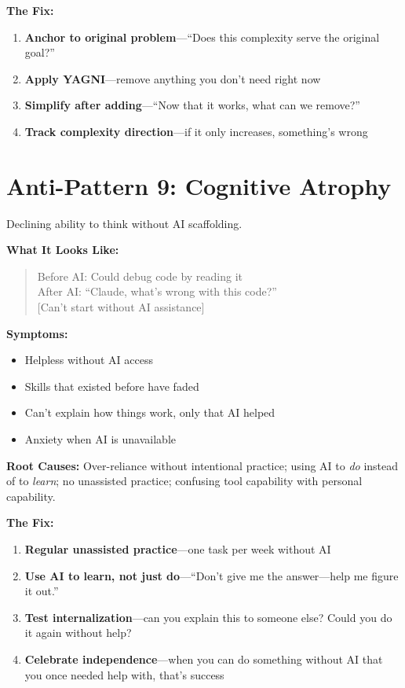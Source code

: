 \textbf{The Fix:}
\begin{enumerate}
    \item \textbf{Anchor to original problem}---``Does this complexity serve the original goal?''
    \item \textbf{Apply YAGNI}---remove anything you don't need right now
    \item \textbf{Simplify after adding}---``Now that it works, what can we remove?''
    \item \textbf{Track complexity direction}---if it only increases, something's wrong
\end{enumerate}

\section{Anti-Pattern 9: Cognitive Atrophy}

Declining ability to think without AI scaffolding.

\textbf{What It Looks Like:}

\begin{quote}
Before AI: Could debug code by reading it\\
After AI: ``Claude, what's wrong with this code?''\\
{[Can't start without AI assistance]}
\end{quote}

\textbf{Symptoms:}
\begin{itemize}
    \item Helpless without AI access
    \item Skills that existed before have faded
    \item Can't explain how things work, only that AI helped
    \item Anxiety when AI is unavailable
\end{itemize}

\textbf{Root Causes:} Over-reliance without intentional practice; using AI to \emph{do} instead of to \emph{learn}; no unassisted practice; confusing tool capability with personal capability.

\textbf{The Fix:}
\begin{enumerate}
    \item \textbf{Regular unassisted practice}---one task per week without AI
    \item \textbf{Use AI to learn, not just do}---``Don't give me the answer---help me figure it out.''
    \item \textbf{Test internalization}---can you explain this to someone else? Could you do it again without help?
    \item \textbf{Celebrate independence}---when you can do something without AI that you once needed help with, that's success
\end{enumerate}

